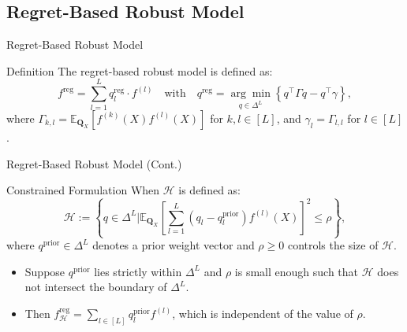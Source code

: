 \documentclass{beamer}
\begin{document}
\subsection{Regret-Based Robust Model}

\begin{frame}{Regret-Based Robust Model}
    \begin{exampleblock}{Definition}
        The regret-based robust model is defined as:
        \begin{equation*}
            f^{\text{reg}} = \sum_{l=1}^{L} q_{l}^{\text{reg}} \cdot f^{(l)} \quad \text{with} \quad q^{\text{reg}} = \underset{q \in \Delta^{L}}{\arg \min} \left\{q^{\intercal} \Gamma q - q^{\intercal} \gamma \right\}, \tag{2.11}
        \end{equation*}
        where $\Gamma_{k,l} = \mathbb{E}_{\mathbf{Q}_{X}} [ f^{(k)} (X) f^{(l)} (X) ]$ for $k, l \in [L]$, and $\gamma_{l} = \Gamma_{l,l}$ for $l \in [L]$.
    \end{exampleblock}
\end{frame}

\begin{frame}{Regret-Based Robust Model (Cont.)}
    \begin{block}{Constrained Formulation}
        When $\mathcal{H}$ is defined as:
        \begin{equation*}
            \mathcal{H} := \left\{q \in \Delta^{L} \big |   \mathbb{E}_{\mathbf{Q}_{X}} \left[ \sum_{l = 1}^{L} (q_{l} - q_{l}^{\text{prior}}) f^{(l)} (X) \right]^{2} \leq \rho \right\}, \tag{2.12}
        \end{equation*}
        where $q^{\mathrm{prior}} \in \Delta^{L}$ denotes a prior weight vector and $\rho \ge 0$ controls the size of $\mathcal{H}$.
    \end{block}
    \begin{itemize}
        \item Suppose $q^{\mathrm{prior}}$ lies strictly within $\Delta^{L}$ and $\rho$ is small enough such that $\mathcal{H}$ does not intersect the boundary of $\Delta^{L}$.
        \item Then $f_{\mathcal{H}}^{\mathrm{reg}} = \sum_{l \in [L]} q_{l}^{\mathrm{prior}} f^{(l)}$, which is independent of the value of $\rho$.
    \end{itemize}
\end{frame}
\end{document}

